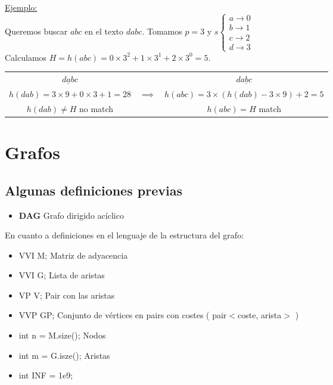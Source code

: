 \documentclass{myclass}
\newcommand{\code}[1]{  #1 }
\begin{document}
\\
\underline{Ejemplo:}\\
Queremos buscar $abc$ en el texto  $dabc$. Tomamos  $p = 3$ y  $s \begin{cases}
  a \to 0\\
  b \to 1\\
  c \to 2\\
  d \to 3
\end{cases}$\\
Calculamos $H = h(abc) = 0\times 3^2 + 1 \times 3^1 + 2\times 3^0 = 5 $.\\
 \begin{center}
\begin{tabular}{ccc}
  $\underline{dab}c$  & & $d\underline{abc}$ \\
  $h(dab) = 3\times 9 + 0\times 3 + 1 = 28$  & $\implies$ &  $h(abc) = 3\times (h(dab)-3\times 9) + 2 = 5$ \\
  $h(dab)\neq  H$ no match & & $h(abc) = H$ match
\end{tabular}
\end{center}
\section{Grafos}
\subsection{Algunas definiciones previas}
\begin{itemize}
    \item \textbf{DAG} Grafo dirigido acíclico
\end{itemize}
En cuanto a definiciones en el lenguaje de la estructura del grafo:
\begin{itemize}
    \item \code{VVI M;} Matriz de adyacencia
    \item \code{VVI G;} Lista de aristas
    \item \code{VP V;}  Pair con las aristas
    \item \code{VVP GP;} Conjunto de vértices en pairs con costes (\code{pair$<$coste, arista$>$})
    \item \code{int n = M.size();} Nodos
    \item \code{int m = G.isze();} Aristas
    \item \code{int INF = 1e9;}
\end{itemize}
\end{document}
